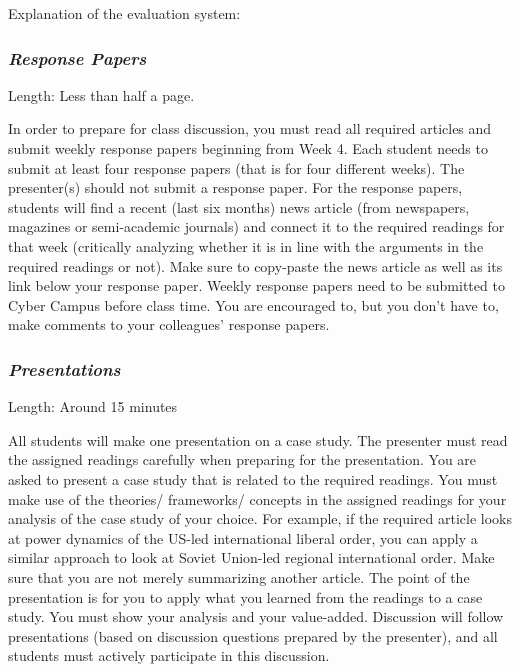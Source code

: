 \documentclass[
  letterpaper,
  DIV=11,
  numbers=noendperiod]{scrartcl}
\begin{document}
Explanation of the evaluation system:

\hypertarget{response-papers}{%
\subsubsection{\texorpdfstring{\textbf{\emph{Response
Papers}}}{Response Papers}}\label{response-papers}}

Length: Less than half a page.

In order to prepare for class discussion, you must read all required
articles and submit weekly response papers beginning from Week 4. Each
student needs to submit at least four response papers (that is for four
different weeks). The presenter(s) should not submit a response paper.
For the response papers, students will find a recent (last six months)
news article (from newspapers, magazines or semi-academic journals) and
connect it to the required readings for that week (critically analyzing
whether it is in line with the arguments in the required readings or
not). Make sure to copy-paste the news article as well as its link below
your response paper. Weekly response papers need to be submitted to
Cyber Campus before class time. You are encouraged to, but you don't
have to, make comments to your colleagues' response papers.

\hypertarget{presentations}{%
\subsubsection{\texorpdfstring{\textbf{\emph{Presentations}}}{Presentations}}\label{presentations}}

Length: Around 15 minutes

All students will make one presentation on a case study. The presenter
must read the assigned readings carefully when preparing for the
presentation. You are asked to present a case study that is related to
the required readings. You must make use of the theories/ frameworks/
concepts in the assigned readings for your analysis of the case study of
your choice. For example, if the required article looks at power
dynamics of the US-led international liberal order, you can apply a
similar approach to look at Soviet Union-led regional international
order. Make sure that you are not merely summarizing another article.
The point of the presentation is for you to apply what you learned from
the readings to a case study. You must show your analysis and your
value-added. Discussion will follow presentations (based on discussion
questions prepared by the presenter), and all students must actively
participate in this discussion.
\end{document}
